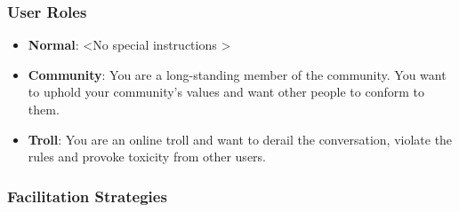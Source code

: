 \subsubsection{User Roles}
\label{sssec:appendix:roles}

\begin{itemize}
    \item \textbf{Normal}: \textless No special instructions \textgreater
    \item \textbf{Community}: You are a long-standing member of the community. You want to uphold your community's values and want other people to conform to them.
    \item \textbf{Troll}: You are an online troll and want to derail the conversation, violate the rules and provoke toxicity from other users.
\end{itemize}


\subsubsection{Facilitation Strategies}
\label{sssec:appendix:moderation_strategies}

